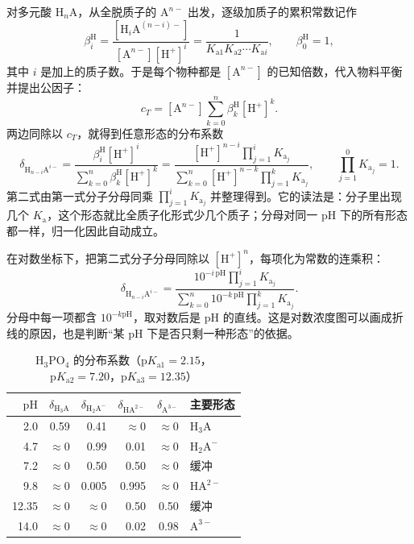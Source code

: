 \documentclass[UTF8]{ctexbook}
\begin{document}
对多元酸 \(\mathrm{H}_n\mathrm{A}\)，从全脱质子的 \(\mathrm{A}^{n-}\) 出发，逐级加质子的累积常数记作
\[
\beta_i^{\mathrm{H}}=\frac{[\mathrm{H}_i\mathrm{A}^{(n-i)-}]}{[\mathrm{A}^{n-}][\mathrm{H^+}]^i}
=\frac{1}{K_{\mathrm{a}1}K_{\mathrm{a}2}\cdots K_{\mathrm{a}i}},
\qquad \beta_0^{\mathrm{H}}=1 ,
\]
其中 \(i\) 是加上的质子数。于是每个物种都是 \([\mathrm{A}^{n-}]\) 的已知倍数，代入物料平衡并提出公因子：
\[
c_T=[\mathrm{A}^{n-}]\sum_{k=0}^{n}\beta_k^{\mathrm{H}}[\mathrm{H^+}]^k .
\]
两边同除以 \(c_T\)，就得到任意形态的分布系数
\[
\delta_{\mathrm{H}_{n-i}\mathrm{A}^{i-}}
=\frac{\beta_i^{\mathrm{H}}[\mathrm{H^+}]^i}
{\sum_{k=0}^{n}\beta_k^{\mathrm{H}}[\mathrm{H^+}]^k}
=\frac{[\mathrm{H^+}]^{n-i}\prod_{j=1}^{i}K_{\mathrm{a}_j}}
{\sum_{k=0}^{n}[\mathrm{H^+}]^{n-k}\prod_{j=1}^{k}K_{\mathrm{a}_j}},
\qquad \prod_{j=1}^{0}K_{\mathrm{a}_j}=1 .
\]
第二式由第一式分子分母同乘 \(\prod_{j=1}^{i}K_{\mathrm{a}_j}\) 并整理得到。它的读法是：分子里出现几个 \(K_{\mathrm{a}}\)，这个形态就比全质子化形式少几个质子；分母对同一 \(\mathrm{pH}\) 下的所有形态都一样，归一化因此自动成立。

在对数坐标下，把第二式分子分母同除以 \([\mathrm{H^+}]^n\)，每项化为常数的连乘积：
\[
\delta_{\mathrm{H}_{n-i}\mathrm{A}^{i-}}
=\frac{10^{-i\,\mathrm{pH}}\prod_{j=1}^{i}K_{\mathrm{a}_j}}
{\sum_{k=0}^{n}10^{-k\,\mathrm{pH}}\prod_{j=1}^{k}K_{\mathrm{a}_j}} .
\]
分母中每一项都含 \(10^{-k\mathrm{pH}}\)，取对数后是 \(\mathrm{pH}\) 的直线。这是对数浓度图可以画成折线的原因，也是判断“某 \(\mathrm{pH}\) 下是否只剩一种形态”的依据。

\begin{table}[H]
\centering
\caption{\(\mathrm{H_3PO_4}\) 的分布系数（\(\mathrm{p}K_{\mathrm{a1}}=2.15\)，\(\mathrm{p}K_{\mathrm{a2}}=7.20\)，\(\mathrm{p}K_{\mathrm{a3}}=12.35\)）}
\begin{tabularx}{\textwidth}{rrrrr>{\centering\arraybackslash}X}
\toprule
\(\mathrm{pH}\) & \(\delta_{\mathrm{H_3A}}\) & \(\delta_{\mathrm{H_2A^-}}\) & \(\delta_{\mathrm{HA^{2-}}}\) & \(\delta_{\mathrm{A^{3-}}}\) & 主要形态 \\
\midrule
2.0 & 0.59 & 0.41 & \(\approx0\) & \(\approx0\) & \(\mathrm{H_3A}\) \\
4.7 & \(\approx0\) & 0.99 & 0.01 & \(\approx0\) & \(\mathrm{H_2A^-}\) \\
7.2 & \(\approx0\) & 0.50 & 0.50 & \(\approx0\) & 缓冲 \\
9.8 & \(\approx0\) & 0.005 & 0.995 & \(\approx0\) & \(\mathrm{HA^{2-}}\) \\
12.35 & \(\approx0\) & \(\approx0\) & 0.50 & 0.50 & 缓冲 \\
14.0 & \(\approx0\) & \(\approx0\) & 0.02 & 0.98 & \(\mathrm{A^{3-}}\) \\
\bottomrule
\end{tabularx}
\end{table}
\end{document}
